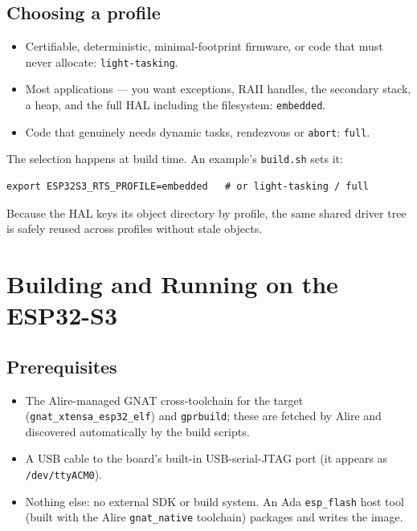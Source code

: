 \section{Choosing a profile}

\begin{itemize}
\item Certifiable, deterministic, minimal-footprint firmware, or code that must
  never allocate: \texttt{light-tasking}.
\item Most applications --- you want exceptions, RAII handles, the secondary
  stack, a heap, and the full HAL including the filesystem: \texttt{embedded}.
\item Code that genuinely needs dynamic tasks, rendezvous or \texttt{abort}:
  \texttt{full}.
\end{itemize}

The selection happens at build time. An example's \texttt{build.sh} sets it:

\begin{lstlisting}[style=sh]
export ESP32S3_RTS_PROFILE=embedded   # or light-tasking / full
\end{lstlisting}

Because the HAL keys its object directory by profile, the same shared driver tree
is safely reused across profiles without stale objects.

\chapter{Building and Running on the ESP32-S3}
\label{ch:build}

\section{Prerequisites}

\begin{itemize}
\item The Alire-managed GNAT cross-toolchain for the target
  (\texttt{gnat\_xtensa\_esp32\_elf}) and \texttt{gprbuild}; these are fetched by
  Alire and discovered automatically by the build scripts.
\item A USB cable to the board's built-in USB-serial-JTAG port (it appears as
  \texttt{/dev/ttyACM0}).
\item Nothing else: no external SDK or build system. An Ada \texttt{esp\_flash}
  host tool (built with the Alire \texttt{gnat\_native} toolchain) packages and
  writes the image.
\end{itemize}

